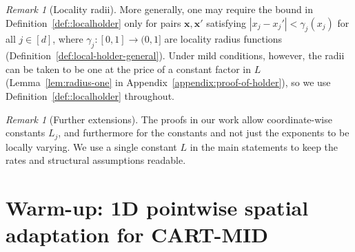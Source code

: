 \documentclass[11pt]{article}
\theoremstyle{plain}
\theoremstyle{definition}
\theoremstyle{remark}
\newtheorem{remark}[theorem]{Remark}
\theoremstyle{plain}
\newcommand{\bx}{\mathbf{x}}
\newcommand{\1}{\mathbbm{1}}
\begin{document}
\begin{remark}[Locality radii]\label{rmk:local-holder}
More generally, one may require the bound in Definition~\ref{def::localholder}
only for pairs $\bx,\bx'$ satisfying $|x_j-x_j'|<\gamma_j(x_j)$ for all
$j\in[d]$, where $\gamma_j:[0,1]\to(0,1]$ are locality radius functions
(Definition~\ref{def:local-holder-general}). Under mild conditions, however,
the radii can be taken to be one at the price of a constant factor in $L$
(Lemma~\ref{lem:radius-one} in Appendix~\ref{appendix:proof-of-holder}), so we
use Definition~\ref{def::localholder} throughout.
\end{remark}

\begin{remark}[Further extensions]
The proofs in our work allow coordinate-wise constants $L_j$, and furthermore for the constants and not just the exponents to be locally varying. We use a single constant $L$ in the main statements to keep the rates and structural assumptions readable.
\end{remark}


\section{Warm-up: 1D pointwise spatial adaptation for CART-MID}
\label{sec:one-dimensional-upper}



\end{document}

